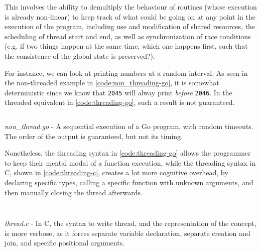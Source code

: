 This involves the ability to demultiply the behaviour of routines (whose execution is already non-linear) to keep track of what could be going on at any point in the execution of the program, including use and modification of shared resources, the scheduling of thread start and end, as well as synchronization of race conditions (e.g. if two things happen at the same time, which one happens first, such that the consistence of the global state is preserved?).

For instance, we can look at printing numbers at a random interval. As seen in the non-threaded example in \autoref{code:non_threading-go}, it is somewhat deterministic since we know that \lstinline{2045} will alway print \emph{before} \lstinline{2046}. In the threaded equivalent in \autoref{code:threading-go}, such a result is not guaranteed.

\begin{listing}
  \inputminted{python}{./corpus/non_thread.go}
  \caption{\emph{non\_thread.go} - A sequential execution of a Go program, with random timeouts. The order of the output is guaranteed, but not its timing.}
  \label{code:non_threading-go}
\end{listing}

Nonetheless, the threading syntax in \autoref{code:threading-go} allows the programmer to keep their mental modal of a function execution, while the threading syntax in C, shown in \autoref{code:threading-c}, creates a lot more cognitive overhead, by declaring specific types, calling a specific function with unknown arguments, and then manually closing the thread afterwards.

\begin{listing}
  \inputminted{python}{./corpus/thread.go}
  \caption{\emph{thread.go} - A concurrent execution of a Go program, with random timeouts. Neither the order nor the timing of the output is guaranteed. The keyword \lstinline{go} when calling the functions \lstinline{recall} instructs the program to run the function in parallel.}
  \label{code:threading-go}
\end{listing}

\begin{listing}
  \inputminted{python}{./corpus/thread.c}
  \caption{\emph{thread.c} - In C, the syntax to write thread, and the representation of the concept, is more verbose, as it forces separate variable declaration, separate creation and join, and specific positional arguments.}
  \label{code:threading-c}
\end{listing}

